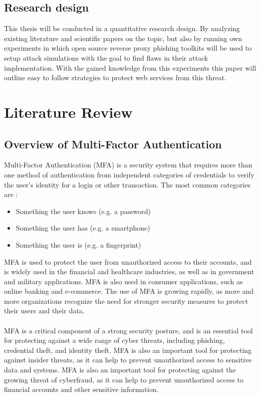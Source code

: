\documentclass[12pt]{report}
\begin{document}
\section{Research design}
This thesis will be conducted in a quantitative research design. By analyzing
existing literature and scientific papers on the topic, but also by running own
experiments in which open source reverse proxy phishing toolkits will be used to
setup attack simulations with the goal to find flaws in their attack implementation.
With the gained knowledge from this experiments this paper will outline easy
to follow strategies to protect web services from this threat.

\newpage
\chapter{Literature Review}
\section{Overview of Multi-Factor Authentication}

Multi-Factor Authentication (MFA) is a security system that requires more than
one method of authentication from independent categories of credentials to verify
the user's identity for a login or other transaction. The most common
categories are \cite{mfa}:
\begin{itemize}
	\item Something the user knows (e.g. a password)

	\item Something the user has (e.g. a smartphone)

	\item Something the user is (e.g. a fingerprint)
\end{itemize}
MFA is used to protect the user from unauthorized access to their accounts,
and is widely used in the financial and healthcare industries, as well as in government
and military applications. MFA is also used in consumer applications, such as online
banking and e-commerce. The use of MFA is growing rapidly, as more and more organizations
recognize the need for stronger security measures to protect their users and their
data. \\ \\ MFA is a critical component of a strong security posture, and is an
essential tool for protecting against a wide range of cyber threats, including
phishing, credential theft, and identity theft. MFA is also an important tool for
protecting against insider threats, as it can help to prevent unauthorized
access to sensitive data and systems. MFA is also an important tool for protecting
against the growing threat of cyberfraud, as it can help to prevent
unauthorized access to financial accounts and other sensitive information. \\ \\
\end{document}
